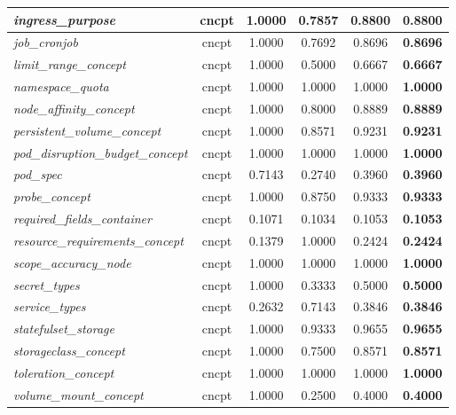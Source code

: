 \begin{footnotesize}
\begin{longtable}{|p{3.6cm}|c|c|c|c|c|}
\hline
\textit{ingress\_\allowbreak{}purpose} & cncpt & 1.0000 & 0.7857 & 0.8800 & \textbf{0.8800} \\
\hline
\textit{job\_\allowbreak{}cronjob} & cncpt & 1.0000 & 0.7692 & 0.8696 & \textbf{0.8696} \\
\hline
\textit{limit\_\allowbreak{}range\_\allowbreak{}concept} & cncpt & 1.0000 & 0.5000 & 0.6667 & \textbf{0.6667} \\
\hline
\textit{namespace\_\allowbreak{}quota} & cncpt & 1.0000 & 1.0000 & 1.0000 & \textbf{1.0000} \\
\hline
\textit{node\_\allowbreak{}affinity\_\allowbreak{}concept} & cncpt & 1.0000 & 0.8000 & 0.8889 & \textbf{0.8889} \\
\hline
\textit{persistent\_\allowbreak{}volume\_\allowbreak{}concept} & cncpt & 1.0000 & 0.8571 & 0.9231 & \textbf{0.9231} \\
\hline
\textit{pod\_\allowbreak{}disruption\_\allowbreak{}budget\_\allowbreak{}concept} & cncpt & 1.0000 & 1.0000 & 1.0000 & \textbf{1.0000} \\
\hline
\textit{pod\_\allowbreak{}spec} & cncpt & 0.7143 & 0.2740 & 0.3960 & \textbf{0.3960} \\
\hline
\textit{probe\_\allowbreak{}concept} & cncpt & 1.0000 & 0.8750 & 0.9333 & \textbf{0.9333} \\
\hline
\textit{required\_\allowbreak{}fields\_\allowbreak{}container} & cncpt & 0.1071 & 0.1034 & 0.1053 & \textbf{0.1053} \\
\hline
\textit{resource\_\allowbreak{}requirements\_\allowbreak{}concept} & cncpt & 0.1379 & 1.0000 & 0.2424 & \textbf{0.2424} \\
\hline
\textit{scope\_\allowbreak{}accuracy\_\allowbreak{}node} & cncpt & 1.0000 & 1.0000 & 1.0000 & \textbf{1.0000} \\
\hline
\textit{secret\_\allowbreak{}types} & cncpt & 1.0000 & 0.3333 & 0.5000 & \textbf{0.5000} \\
\hline
\textit{service\_\allowbreak{}types} & cncpt & 0.2632 & 0.7143 & 0.3846 & \textbf{0.3846} \\
\hline
\textit{statefulset\_\allowbreak{}storage} & cncpt & 1.0000 & 0.9333 & 0.9655 & \textbf{0.9655} \\
\hline
\textit{storageclass\_\allowbreak{}concept} & cncpt & 1.0000 & 0.7500 & 0.8571 & \textbf{0.8571} \\
\hline
\textit{toleration\_\allowbreak{}concept} & cncpt & 1.0000 & 1.0000 & 1.0000 & \textbf{1.0000} \\
\hline
\textit{volume\_\allowbreak{}mount\_\allowbreak{}concept} & cncpt & 1.0000 & 0.2500 & 0.4000 & \textbf{0.4000} \\

\end{longtable}
\end{footnotesize}
